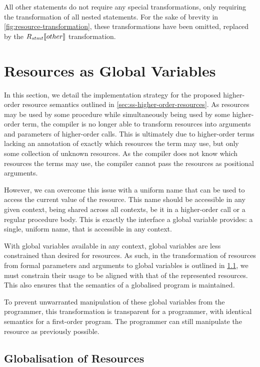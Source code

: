 All other statements do not require any special transformations, only requiring the transformation of all nested statements. For the sake of brevity in \cref{fig:resource-transformation}, these transformations have been omitted, replaced by the $R_{stmt}\bbrackets*{other}$ transformation.

\section{Resources as Global Variables}
\label{sec:resources-as-globals}

In this section, we detail the implementation strategy for the proposed higher-order resource semantics outlined in \cref{sec:ss-higher-order-resources}. As resources may be used by some procedure while simultaneously being used by some higher-order term, the compiler is no longer able to transform resources into arguments and parameters of higher-order calls. This is ultimately due to higher-order terms lacking an annotation of exactly which resources the term may use, but only some collection of unknown resources. As the compiler does not know which resources the terms may use, the compiler cannot pass the resources as positional arguments.

However, we can overcome this issue with a uniform name that can be used to access the current value of the resource. This name should be accessible in any given context, being shared across all contexts, be it in a higher-order call or a regular procedure body. This is exactly the interface a global variable provides: a single, uniform name, that is accessible in any context.

With global variables available in any context, global variables are less constrained than desired for resources. As such, in the transformation of resources from formal parameters and arguments to global variables is outlined in \cref{ssec:global-resource-transformation}, we must constrain their usage to be aligned with that of the represented resources. This also ensures that the semantics of a globalised program is maintained.

To prevent unwarranted manipulation of these global variables from the programmer, this transformation is transparent for a programmer, with identical semantics for a first-order program. The programmer can still manipulate the resource as previously possible.

\subsection{Globalisation of Resources}
\label{ssec:global-resource-transformation}

